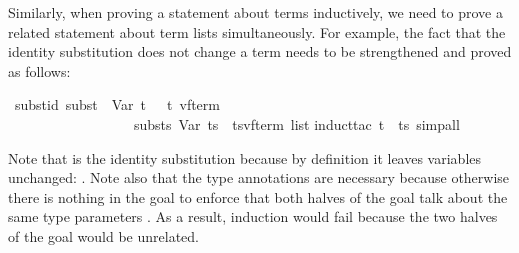 \begin{isabellebody}
\begin{isamarkuptext}
Similarly, when proving a statement about terms inductively, we need
to prove a related statement about term lists simultaneously. For example,
the fact that the identity substitution does not change a term needs to be
strengthened and proved as follows:%
\end{isamarkuptext}%
\isamarkuptrue%
\isamarkupfalse%
\ subst{}id{}\ {}subst\ \ Var\ t\ \ {}\ {}t\ {}{}{}{}v{}{}f{}term{}\ \ {}\isanewline
\ \ \ \ \ \ \ \ \ \ \ \ \ \ \ \ \ \ substs\ Var\ ts\ {}\ {}ts{}{}{}{}v{}{}f{}term\ list{}{}\isanewline
%
\isadelimproof
%
\endisadelimproof
%
\isatagproof
{}\isamarkupfalse%
{}induct{}tac\ t\ \ ts{}\ simp{}all{}\isanewline
{}\isamarkupfalse%
%
\endisatagproof
{\isafoldproof}%
%
\isadelimproof
%
\endisadelimproof
%
\begin{isamarkuptext}%
\noindent
Note that  is the identity substitution because by definition it
leaves variables unchanged: . Note also
that the type annotations are necessary because otherwise there is nothing in
the goal to enforce that both halves of the goal talk about the same type
parameters . As a result, induction would fail
because the two halves of the goal would be unrelated.


\end{isamarkuptext}
\end{isabellebody}

